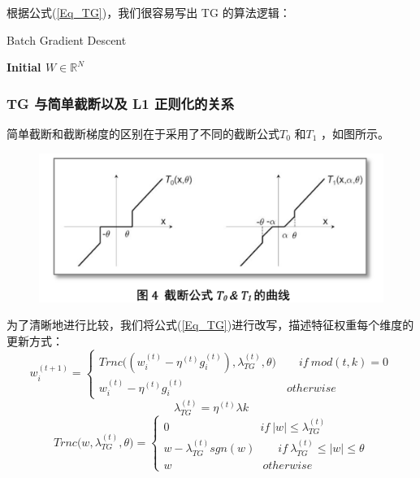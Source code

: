 \documentclass[12pt]{article}
\begin{document}
根据公式(\ref{Eq_TG})，我们很容易写出 TG 的算法逻辑：
\begin{algorithm}  
\caption{Batch Gradient Descent}  
\KwIn{$\theta$}

\textbf{Initial $W \in \mathbb{R}^N$}

\end{algorithm}  

\subsubsection{TG 与简单截断以及 L1 正则化的关系}
简单截断和截断梯度的区别在于采用了不同的截断公式$T_0$ 和$T_1$ ，如图所示。
\begin{figure}[H]
    \centering
    \includegraphics[width=.8\textwidth]{fig/OnlineOptimization-T0T1.png}
\end{figure}

为了清晰地进行比较，我们将公式(\ref{Eq_TG})进行改写，描述特征权重每个维度的更新方式：
$$
w_i^{(t+1)} = \begin{cases}
Trnc\big((w_i^{(t)} - \eta^{(t)}g_i^{(t)}), \lambda_{TG}^{(t)}, \theta\big) \qquad if \ mod(t, k) = 0 \\
w_i^{(t)} - \eta^{(t)}g_i^{(t)} \qquad \qquad \qquad \qquad \quad otherwise
\end{cases}
$$
$$
\lambda_{TG}^{(t)} = \eta^{(t)}\lambda k
$$
$$
Trnc\big( w, \lambda_{TG}^{(t)}, \theta \big) = \begin{cases}
0 \qquad \qquad \qquad \qquad if \ |w| \le \lambda_{TG}^{(t)} \\
w - \lambda_{TG}^{(t)} sgn(w) \qquad if \ \lambda_{TG}^{(t)} \le |w| \le \theta \\
w \qquad \qquad \qquad \qquad otherwise
\end{cases}
$$
\end{document}
